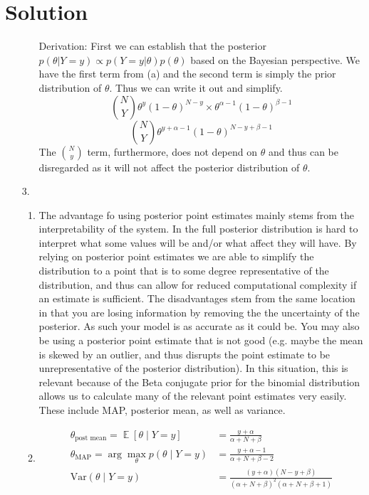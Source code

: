 \documentclass[submit]{harvardml}
\newenvironment{answer}
  {\section*{Solution}}
{}
\DeclareMathOperator*{\mean}{\mathbb{E}}
\begin{document}
\begin{answer}
\begin{enumerate}
\begin{enumerate}
              Derivation:
              First we can establish that the posterior $p(\theta|Y=y) \propto p(Y=y|\theta)p(\theta)$ based on the Bayesian perspective. We have the first term from (a) and the second term is simply the prior distribution of $\theta$. Thus we can write it out and simplify. 
        $${N \choose Y}\theta^y(1-\theta)^{N-y} \times \theta^{\alpha-1}(1-\theta)^{\beta -1}$$
        $${N \choose Y} \theta^{y+\alpha-1}(1-\theta)^{N-y+\beta-1}$$
        The $N \choose y$ term, furthermore, does not depend on $\theta$ and thus can be disregarded as it will not affect the posterior distribution of $\theta$.  

      \end{enumerate}

    \item[3.]

      \begin{enumerate}
        \item 
        The advantage fo using posterior point estimates mainly stems from the interpretability of the system. In the full posterior distribution is hard to interpret what some values will be and/or what affect they will have. By relying on posterior point estimates we are able to simplify the distribution to a point that is to some degree representative of the distribution, and thus can allow for reduced computational complexity if an estimate is sufficient. The disadvantages stem from the same location in that you are losing information by removing the the uncertainty of the posterior. As such your model is as accurate as it could be. You may also be using a posterior point estimate that is not good (e.g. maybe the mean is skewed by an outlier, and thus disrupts the point estimate to be unrepresentative of the posterior distribution). In this situation, this is relevant because of the Beta conjugate prior for the binomial distribution allows us to calculate many of the relevant point estimates very easily. These include MAP, posterior mean, as well as variance. 
        \item
              \begin{align*}
                \theta_{\text{post mean}} = \mean [\theta \mid Y = y]     & = \frac{y+\alpha}{\alpha + N + \beta}\\
                \theta_{\text{MAP}} =\arg \max_{\theta}p(\theta \mid Y=y) & = \frac{y+\alpha - 1}{\alpha+N+\beta-2}\\
                \mathrm{Var}(\theta \mid Y = y)                           & =\frac{(y+\alpha)(N-y+\beta)}{(\alpha+N+\beta)^2(\alpha + N +\beta+1)}
              \end{align*}


\end{enumerate}
\end{enumerate}
\end{answer}
\end{document}

